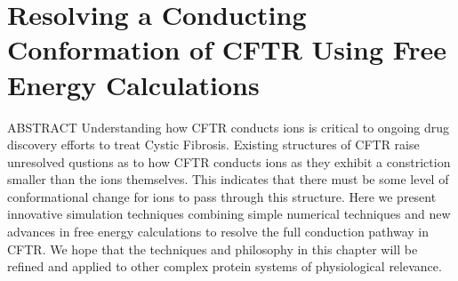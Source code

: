 \chapter{Resolving a Conducting Conformation of CFTR Using Free Energy Calculations}
\label{chap:opening}
\chapquote{} {}
ABSTRACT 
Understanding how CFTR conducts ions is critical to ongoing drug discovery efforts to treat Cystic Fibrosis. Existing structures of CFTR  raise unresolved qustions as to how CFTR conducts ions as they exhibit a constriction smaller than the ions themselves. This indicates that there must be some level of conformational change for ions to pass through this structure. Here we present innovative simulation techniques combining simple numerical techniques and new advances in free energy calculations to resolve the full conduction pathway in CFTR. We hope that the techniques and philosophy in this chapter will be refined and applied to other complex protein systems of physiological relevance. 
\newline
